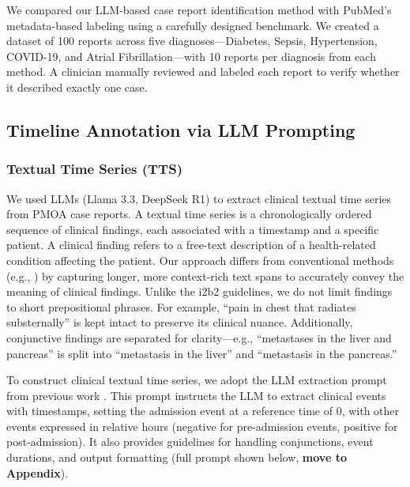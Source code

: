 We compared our LLM-based case report identification method with PubMed's metadata-based labeling using a carefully designed benchmark. We created a dataset of 100 reports across five diagnoses—Diabetes, Sepsis, Hypertension, COVID-19, and Atrial Fibrillation—with 10 reports per diagnosis from each method. A clinician manually reviewed and labeled each report to verify whether it described exactly one case. 



\subsection{Timeline Annotation via LLM Prompting}

\subsubsection{Textual Time Series (TTS)}

We used LLMs (Llama 3.3, DeepSeek R1) to extract clinical textual time series from PMOA case reports. A textual time series is a chronologically ordered sequence of clinical findings, each associated with a timestamp and a specific patient. A clinical finding refers to a free-text description of a health-related condition affecting the patient. Our approach differs from conventional methods (e.g., \cite{sun2013evaluating, uzuner20112010}) by capturing longer, more context-rich text spans to accurately convey the meaning of clinical findings. Unlike the i2b2 guidelines, we do not limit findings to short prepositional phrases. For example, ``pain in chest that radiates substernally'' is kept intact to preserve its clinical nuance. Additionally, conjunctive findings are separated for clarity—e.g., ``metastases in the liver and pancreas'' is split into ``metastasis in the liver'' and ``metastasis in the pancreas.''

To construct clinical textual time series, we adopt the LLM extraction prompt from previous work \citep{wang2025large,noroozizadeh2025reconstructing}. This prompt instructs the LLM to extract clinical events with timestamps, setting the admission event at a reference time of 0, with other events expressed in relative hours (negative for pre-admission events, positive for post-admission). It also provides guidelines for handling conjunctions, event durations, and output formatting (full prompt shown below, \textbf{move to Appendix}).

